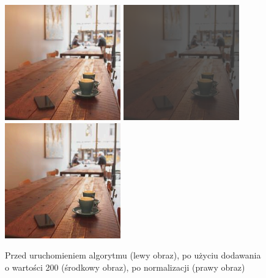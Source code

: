 \documentclass[a4paper,12pt]{book}
\begin{document}
\begin{figure}[H]
\caption{Przed uruchomieniem algorytmu (lewy obraz), po użyciu dodawania o wartości 200 (środkowy obraz), po normalizacji (prawy obraz)}
\includegraphics[width=5cm, height=5cm]{coffee-unmodified.jpg}
\includegraphics[width=5cm, height=5cm]{3-1/sum-color-const-coffee-200.png}
\includegraphics[width=5cm, height=5cm]{3-1/sum-color-const-coffee-200-norm.png}
\end{figure}
\end{document}
